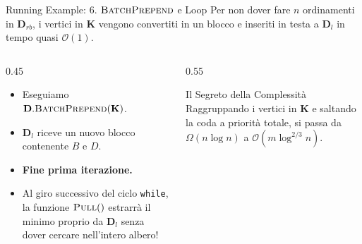 \documentclass[aspectratio=169]{beamer}
\begin{document}
\begin{frame}{Running Example: 6. $\textsc{BatchPrepend}$ e Loop}
    Per non dover fare $n$ ordinamenti in $\mathbf{D}_{rb}$, i vertici in $\mathbf{K}$ vengono convertiti in un blocco e inseriti in testa a $\mathbf{D}_l$ in tempo quasi $\mathcal{O}(1)$.
    \vspace{0.3cm}
    
    \begin{columns}
        \begin{column}{0.45\textwidth}
            \begin{itemize}
                \item Eseguiamo $\mathbf{D}.\textsc{BatchPrepend}(\mathbf{K})$.
                \item $\mathbf{D}_l$ riceve un nuovo blocco contenente $B$ e $D$.
                \item \textbf{Fine prima iterazione.} 
                \item Al giro successivo del ciclo \texttt{while}, la funzione $\textsc{Pull}()$ estrarrà il minimo proprio da $\mathbf{D}_l$ senza dover cercare nell'intero albero!
            \end{itemize}
        \end{column}
        \begin{column}{0.55\textwidth}
            \begin{center}
            \end{center}
            \vspace{0.2cm}
            \begin{block}{Il Segreto della Complessità}
            Raggruppando i vertici in $\mathbf{K}$ e saltando la coda a priorità totale, si passa da $\Omega(n \log n)$ a $\mathcal{O}(m \log^{2/3} n)$.
            \end{block}
        \end{column}
    \end{columns}
\end{frame}
\end{document}
